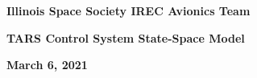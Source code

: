 \documentclass[12pt,table]{article}
\begin{document}
\begin{titlepage}
\hspace{0pt}
\vfill
\centering\large{\textbf{Illinois Space Society IREC Avionics Team}}
\par
\centering\large{\textbf{TARS Control System State-Space Model}}
\par

\vfill

\centering\textbf{March 6, 2021}
\thispagestyle{empty}
\end{titlepage}


\setcounter{page}{1}





\end{document}
